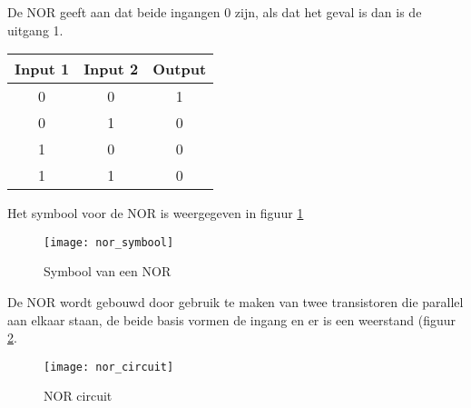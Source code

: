 De NOR geeft aan dat beide ingangen 0 zijn, als dat het geval is dan is de uitgang 1.

\begin{tabular}{ |c|c|c| }
\hline
\rowcolor{gray!60}
	Input 1 & Input 2 & Output \\
	\hline
	0 & 0 & 1 \\
	\hline
	0 & 1 & 0 \\
	\hline
	1 & 0 & 0 \\
	\hline
	1 & 1 & 0 \\
	\hline
\end{tabular}

Het symbool voor de NOR is weergegeven in figuur \ref{symbool:nor}

\begin{figure}[h]
\texttt{[image: nor\_symbool]}
\centering
\caption{Symbool van een NOR}
\label{symbool:nor}
\end{figure}

De NOR wordt gebouwd door gebruik te maken van twee transistoren die parallel aan elkaar staan, de beide basis vormen de ingang en er is een weerstand (figuur \ref{circuit:nor}.

\begin{figure}[h]
\texttt{[image: nor\_circuit]}
\centering
\caption{NOR circuit}
\label{circuit:nor}
\end{figure}

